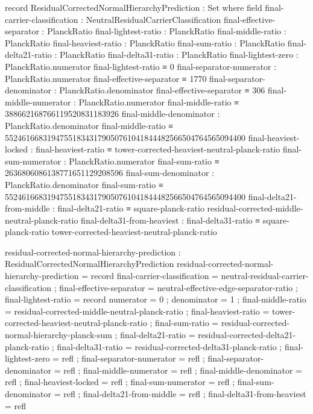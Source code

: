 \documentclass[11pt]{article}
\begin{document}
\begin{code}
record ResidualCorrectedNormalHierarchyPrediction : Set where
  field
    final-carrier-classification : NeutralResidualCarrierClassification
    final-effective-separator    : PlanckRatio
    final-lightest-ratio         : PlanckRatio
    final-middle-ratio           : PlanckRatio
    final-heaviest-ratio         : PlanckRatio
    final-sum-ratio              : PlanckRatio
    final-delta21-ratio          : PlanckRatio
    final-delta31-ratio          : PlanckRatio
    final-lightest-zero          :
      PlanckRatio.numerator final-lightest-ratio ≡ 0
    final-separator-numerator    :
      PlanckRatio.numerator final-effective-separator ≡ 1770
    final-separator-denominator  :
      PlanckRatio.denominator final-effective-separator ≡ 306
    final-middle-numerator       :
      PlanckRatio.numerator final-middle-ratio
        ≡ 388662168766119520831183926
    final-middle-denominator     :
      PlanckRatio.denominator final-middle-ratio
        ≡ 552461668319475518343179050761041844482566504764565094400
    final-heaviest-locked        :
      final-heaviest-ratio ≡ tower-corrected-heaviest-neutral-planck-ratio
    final-sum-numerator          :
      PlanckRatio.numerator final-sum-ratio
        ≡ 2636806086138771651129208596
    final-sum-denominator        :
      PlanckRatio.denominator final-sum-ratio
        ≡ 552461668319475518343179050761041844482566504764565094400
    final-delta21-from-middle    :
      final-delta21-ratio ≡
      square-planck-ratio residual-corrected-middle-neutral-planck-ratio
    final-delta31-from-heaviest  :
      final-delta31-ratio ≡
      square-planck-ratio tower-corrected-heaviest-neutral-planck-ratio

residual-corrected-normal-hierarchy-prediction :
  ResidualCorrectedNormalHierarchyPrediction
residual-corrected-normal-hierarchy-prediction = record
  { final-carrier-classification = neutral-residual-carrier-classification
  ; final-effective-separator    = neutral-effective-edge-separator-ratio
  ; final-lightest-ratio         = record { numerator = 0 ; denominator = 1 }
  ; final-middle-ratio           = residual-corrected-middle-neutral-planck-ratio
  ; final-heaviest-ratio         = tower-corrected-heaviest-neutral-planck-ratio
  ; final-sum-ratio              = residual-corrected-normal-hierarchy-planck-sum
  ; final-delta21-ratio          = residual-corrected-delta21-planck-ratio
  ; final-delta31-ratio          = residual-corrected-delta31-planck-ratio
  ; final-lightest-zero          = refl
  ; final-separator-numerator    = refl
  ; final-separator-denominator  = refl
  ; final-middle-numerator       = refl
  ; final-middle-denominator     = refl
  ; final-heaviest-locked        = refl
  ; final-sum-numerator          = refl
  ; final-sum-denominator        = refl
  ; final-delta21-from-middle    = refl
  ; final-delta31-from-heaviest  = refl
  }
\end{code}
\end{document}
